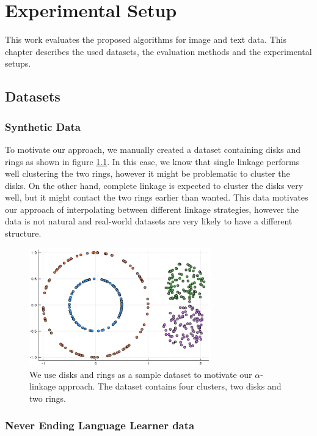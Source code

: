 \chapter{Experimental Setup}

This work evaluates the proposed algorithms for image and text data. This chapter describes the used datasets, the evaluation methods and the experimental setups.

\section{Datasets}
\label{chapter:datasets}

\subsection{Synthetic Data}

To motivate our approach, we manually created a dataset containing disks and rings as shown in figure \ref{fig:disksrings}. In this case, we know that single linkage performs well clustering the two rings, however it might be problematic to cluster the disks. On the other hand, complete linkage is expected to cluster the disks very well, but it might contact the two rings earlier than wanted. This data motivates our approach of interpolating between different linkage strategies, however the data is not natural and real-world datasets are very likely to have a different structure. 

\begin{figure}[h]
    \centering
    \includegraphics[width=0.7\textwidth]{images/RingsDisks}
    \caption{We use disks and rings as a sample dataset to motivate our $\alpha$-linkage approach. The dataset contains four clusters, two disks and two rings.}
    \label{fig:disksrings}
\end{figure}

\subsection{Never Ending Language Learner data}

